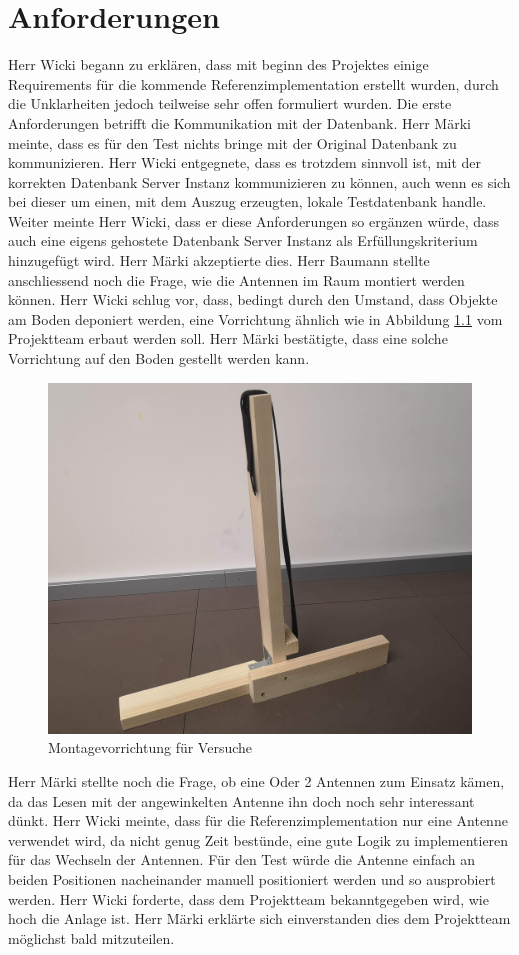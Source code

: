 \documentclass[parskip=full, a4paper]{scrreprt}
\begin{document}
\chapter{Anforderungen}
Herr Wicki begann zu erklären, dass mit beginn des Projektes einige Requirements für die kommende Referenzimplementation erstellt wurden, durch die Unklarheiten jedoch teilweise sehr offen formuliert wurden. Die erste Anforderungen betrifft die Kommunikation mit der Datenbank. Herr Märki meinte, dass es für den Test nichts bringe mit der Original Datenbank zu kommunizieren. Herr Wicki entgegnete, dass es trotzdem sinnvoll ist, mit der korrekten Datenbank Server Instanz kommunizieren zu können, auch wenn es sich bei dieser um einen, mit dem Auszug erzeugten, lokale Testdatenbank handle. Weiter meinte Herr Wicki, dass er diese Anforderungen so ergänzen würde, dass auch eine eigens gehostete Datenbank Server Instanz als Erfüllungskriterium hinzugefügt wird. Herr Märki akzeptierte dies.
Herr Baumann stellte anschliessend noch die Frage, wie die Antennen im Raum montiert werden können. Herr Wicki schlug vor, dass, bedingt durch den Umstand, dass Objekte am Boden deponiert werden, eine Vorrichtung ähnlich wie in Abbildung \ref{fig:montagevorrichtung} vom Projektteam erbaut werden soll. Herr Märki bestätigte, dass eine solche Vorrichtung auf den Boden gestellt werden kann.
\begin{figure}[htb]
	\centering
	\includegraphics[keepaspectratio,width=.7\linewidth]{img/Montagevorrichtung}
	\caption{Montagevorrichtung für Versuche}
	\label{fig:montagevorrichtung}
\end{figure}
Herr Märki stellte noch die Frage, ob eine Oder 2 Antennen zum Einsatz kämen, da das Lesen mit der angewinkelten Antenne ihn doch noch sehr interessant dünkt. Herr Wicki meinte, dass für die Referenzimplementation nur eine Antenne verwendet wird, da nicht genug Zeit bestünde, eine gute Logik zu implementieren für das Wechseln der Antennen. Für den Test würde die Antenne einfach an beiden Positionen nacheinander manuell positioniert werden und so ausprobiert werden.
Herr Wicki forderte, dass dem Projektteam bekanntgegeben wird, wie hoch die Anlage ist. Herr Märki erklärte sich einverstanden dies dem Projektteam möglichst bald mitzuteilen.
\end{document}
